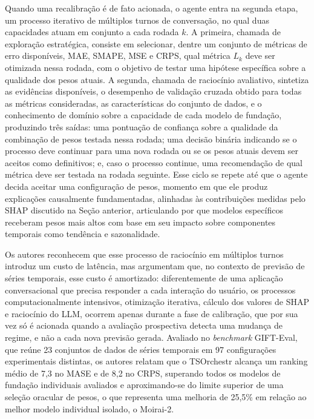 Quando uma recalibração é de fato acionada, o agente entra na segunda etapa, um processo iterativo de múltiplos turnos de conversação, no qual duas capacidades atuam em conjunto a cada rodada $k$. A primeira, chamada de exploração estratégica, consiste em selecionar, dentre um conjunto de métricas de erro disponíveis, MAE, SMAPE, MSE e CRPS, qual métrica $L_k$ deve ser otimizada nessa rodada, com o objetivo de testar uma hipótese específica sobre a qualidade dos pesos atuais. A segunda, chamada de raciocínio avaliativo, sintetiza as evidências disponíveis, o desempenho de validação cruzada obtido para todas as métricas consideradas, as características do conjunto de dados, e o conhecimento de domínio sobre a capacidade de cada modelo de fundação, produzindo três saídas: uma pontuação de confiança sobre a qualidade da combinação de pesos testada nessa rodada; uma decisão binária indicando se o processo deve continuar para uma nova rodada ou se os pesos atuais devem ser aceitos como definitivos; e, caso o processo continue, uma recomendação de qual métrica deve ser testada na rodada seguinte. Esse ciclo se repete até que o agente decida aceitar uma configuração de pesos, momento em que ele produz explicações causalmente fundamentadas, alinhadas às contribuições medidas pelo SHAP discutido na Seção anterior, articulando por que modelos específicos receberam pesos mais altos com base em seu impacto sobre componentes temporais como tendência e sazonalidade.

Os autores reconhecem que esse processo de raciocínio em múltiplos turnos introduz um custo de latência, mas argumentam que, no contexto de previsão de séries temporais, esse custo é amortizado: diferentemente de uma aplicação conversacional que precisa responder a cada interação do usuário, os processos computacionalmente intensivos, otimização iterativa, cálculo dos valores de SHAP e raciocínio do LLM, ocorrem apenas durante a fase de calibração, que por sua vez só é acionada quando a avaliação prospectiva detecta uma mudança de regime, e não a cada nova previsão gerada. Avaliado no \textit{benchmark} GIFT-Eval, que reúne 23 conjuntos de dados de séries temporais em 97 configurações experimentais distintas, os autores relatam que o TSOrchestr alcança um ranking médio de 7,3 no MASE e de 8,2 no CRPS, superando todos os modelos de fundação individuais avaliados e aproximando-se do limite superior de uma seleção oracular de pesos, o que representa uma melhoria de 25,5\% em relação ao melhor modelo individual isolado, o Moirai-2.





